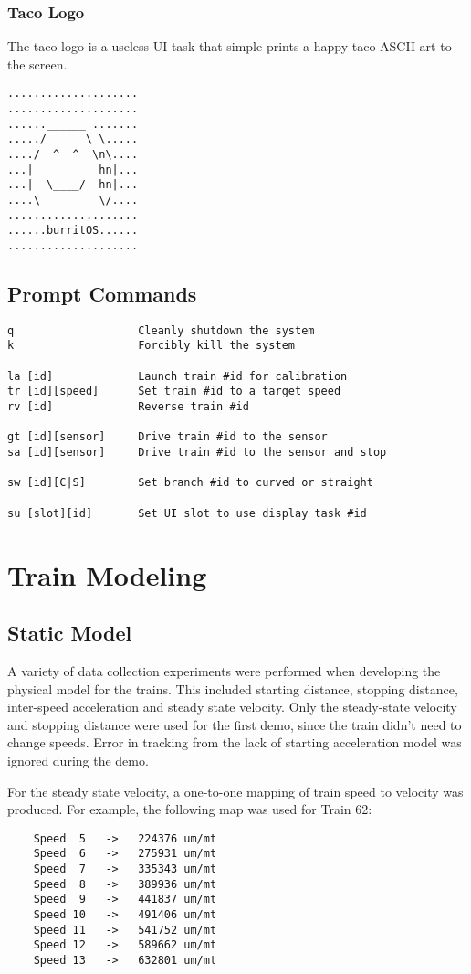 \documentclass[twoside,a4paper]{refart}
\begin{document}
\subsubsection{Taco Logo}

The taco logo is a useless UI task that simple prints a happy taco ASCII art to the screen.

\begin{verbatim}
....................
....................
......______ .......
...../      \ \.....
..../  ^  ^  \n\....
...|          hn|...
...|  \____/  hn|...
....\_________\/....
....................
......burritOS......
....................
\end{verbatim}

\subsection{Prompt Commands}
\begin{verbatim}
q                   Cleanly shutdown the system
k                   Forcibly kill the system

la [id]             Launch train #id for calibration
tr [id][speed]      Set train #id to a target speed
rv [id]             Reverse train #id

gt [id][sensor]     Drive train #id to the sensor
sa [id][sensor]     Drive train #id to the sensor and stop

sw [id][C|S]        Set branch #id to curved or straight

su [slot][id]       Set UI slot to use display task #id
\end{verbatim}

\section{Train Modeling}

\subsection{Static Model}
A variety of data collection experiments were performed when developing the physical model for the trains. This included starting distance, stopping distance, inter-speed acceleration and steady state velocity. Only the steady-state velocity and stopping distance were used for the first demo, since the train didn't need to change speeds. Error in tracking from the lack of starting acceleration model was ignored during the demo.

For the steady state velocity, a one-to-one mapping of train speed to velocity was produced. For example, the following map was used for Train 62:
\begin{verbatim}
    Speed  5   ->   224376 um/mt
    Speed  6   ->   275931 um/mt
    Speed  7   ->   335343 um/mt
    Speed  8   ->   389936 um/mt
    Speed  9   ->   441837 um/mt
    Speed 10   ->   491406 um/mt
    Speed 11   ->   541752 um/mt
    Speed 12   ->   589662 um/mt
    Speed 13   ->   632801 um/mt
\end{verbatim}
\end{document}

